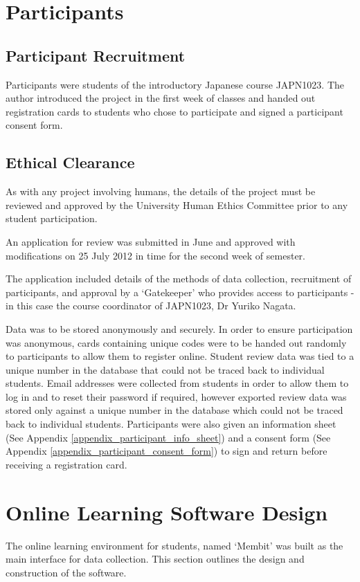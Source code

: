 \section{Participants}
\subsection{Participant Recruitment}
Participants were students of the introductory Japanese course JAPN1023. The author
introduced the project in the first week of classes and handed out registration cards
to students who chose to participate and signed a participant consent form.

\subsection{Ethical Clearance}
\label{methods_ethical}
As with any project involving humans, the details of the project must be reviewed and 
approved by the University Human Ethics Committee prior to any student participation.

An application for review was submitted in June and approved with modifications
on 25 July 2012 in time for the second week of semester.

The application included details of the methods of data collection, recruitment of participants,
and approval by a `Gatekeeper' who provides access to participants - in this case the course coordinator of JAPN1023, Dr Yuriko Nagata.

Data was to be stored anonymously and securely. In order to ensure participation was anonymous,
cards containing unique codes were to be handed out randomly to participants to allow them to
register online. Student review data was tied to a unique number in the database that could
not be traced back to individual students. Email addresses were collected from students in order
to allow them to log in and to reset their password if required, however exported review data was
stored only against a unique number in the database which could not be traced back to individual
students. Participants were also given an information sheet (See Appendix
\ref{appendix_participant_info_sheet}) and a consent form (See Appendix
\ref{appendix_participant_consent_form}) to sign and return before receiving a registration card.

\section{Online Learning Software Design}
The online learning environment for students, named `Membit' was built as the main interface
for data collection. This section outlines the design and construction of the software.
\label{methods_softwaredesign}

